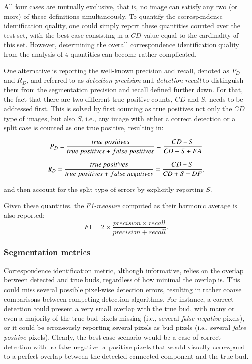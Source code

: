 \documentclass[a4paper,authoryear,review]{elsarticle}
\begin{document}
	All four cases are mutually exclusive, that is, no image can satisfy any two (or more) of these definitions simultaneously. To quantify the correspondence identification quality, one could simply report these quantities counted over the test set, with the best case consisting in a $CD$ value equal to the cardinality of this set. However, determining the overall correspondence identification quality from the analysis of $4$ quantities can become rather complicated. 
	
	One alternative is reporting the well-known precision and recall, denoted as $P_D$ and $R_D$, and referred to as \emph{detection-precision} and \emph{detection-recall} to distinguish them from the segmentation precision and recall defined further down. For that, the fact that there are two different true positive counts, $CD$ and $S$, needs to be addressed first. This is solved by first counting as true positives not only the $CD$ type of images, but also $S$, i.e., any image with either a correct detection or a split case is counted as one true positive, resulting in:
	
	\begin{equation}
		P_D = \frac{true\ positives}{true\ positives+false\ positives} \\
		= \frac{CD+S}{CD+S+FA}
		\label{eq:detection-precision}
	\end{equation}
	
	\begin{equation}
		R_D = \frac{true\ positives}{true\ positives+false\ negatives} \\
		= \frac{CD+S}{CD+S+DF},
		\label{eq:detection-recall}
	\end{equation}
	
	and then account for the split type of errors by explicitly reporting $S$. 
	
	Given these quantities, the \emph{F1-measure} computed as their harmonic average is also reported:
	\[
	F1 = 2 \times \frac{precision \times recall}{precision + recall}.
	\] 
	
	\subsubsection{Segmentation metrics}
	\label{subsec:segmetrics}
	
	Correspondence identification metric, although informative, relies on the overlap between detected and true buds, regardless of how minimal the overlap is. This could miss several possible pixel-wise detection errors, resulting in rather coarse comparisons between competing detection algorithms. For instance, a correct detection could present a very small overlap with the true bud, with many or even a majority of the true bud pixels missing (i.e., several \emph{false negative} pixels), or it could be erroneously reporting several pixels as bud pixels (i.e., several \emph{false positive} pixels). Clearly, the best case scenario would be a case of correct detection with no false negative or positive pixels that would visually correspond to a perfect overlap between the detected connected component and the true bud. 
	
\end{document}
